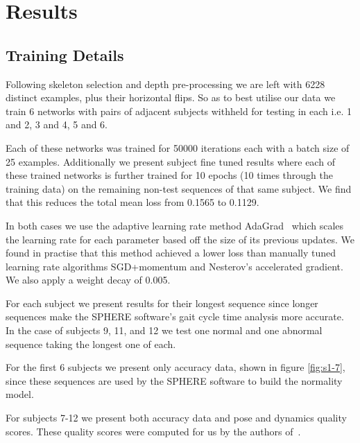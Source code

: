 \documentclass[11pt]{article} %
\begin{document}
\section{Results}

\subsection{Training Details}


Following skeleton selection and depth pre-processing we are left with 6228 distinct examples, plus their horizontal flips. So as to best utilise our data we train 6 networks with pairs of adjacent subjects withheld for testing in each i.e. 1 and 2, 3 and 4, 5 and 6. 

Each of these networks was trained for 50000 iterations each with a batch size of 25 examples. Additionally we present subject fine tuned results where each of these trained networks is further trained for 10 epochs (10 times through the training data) on the remaining non-test sequences of that  same subject. We find that this reduces the total mean loss from 0.1565 to 0.1129.

In both cases we use the adaptive learning rate method AdaGrad~\cite{Duchi2011} which scales the learning rate for each parameter based off the size of its previous updates. We found in practise that this method achieved a lower loss than manually tuned learning rate algorithms SGD+momentum and Nesterov's accelerated gradient. We also apply a weight decay of 0.005.  

For each subject we present results for their longest sequence since longer sequences make the SPHERE software's gait cycle time analysis more accurate. In the case of subjects 9, 11, and 12 we test one normal and one abnormal sequence taking the longest one of each. 

For the first 6 subjects we present only accuracy data, shown in figure \ref{fig:s1-7}, since these sequences are used by the SPHERE software to build the normality model.

For subjects 7-12 we present both accuracy data and pose and dynamics quality scores. These quality scores were computed for us by the authors of~\cite{Paiement}. 
\end{document}
